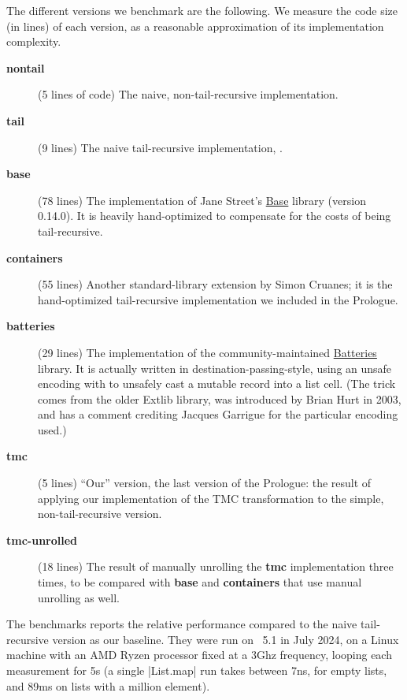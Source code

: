 \newcommand{\bench}[1]{\textbf{#1}}

The different versions we benchmark are the following. We measure the code size (in lines) of each version, as a reasonable approximation of its implementation complexity.
\begin{description}
\item[\bench{nontail}] (5 lines of code) The naive, non-tail-recursive implementation.
\item[\bench{tail}] (9 lines) The naive tail-recursive implementation,
  .
\item[\bench{base}] (78 lines) The implementation of Jane Street's
  \href{https://github.com/janestreet/base}{Base} library
  (version 0.14.0). It is heavily hand-optimized to compensate for the costs
  of being tail-recursive.
\item[\bench{containers}] (55 lines) Another standard-library extension by Simon
  Cruanes; it is the hand-optimized tail-recursive implementation we
  included in the Prologue.
\item[\bench{batteries}] (29 lines) The implementation of the community-maintained
  \href{https://github.com/ocaml-batteries-team/batteries-included/}{Batteries}
  library. It is actually written in destination-passing-style, using
  an unsafe encoding with  to unsafely cast a mutable
  record into a list cell. (The trick comes from the older Extlib
  library, was introduced by Brian Hurt in 2003, and has a comment crediting Jacques
  Garrigue for the particular encoding used.)
\item[\bench{tmc}] (5 lines) ``Our'' version, the last version of the Prologue: the
  result of applying our implementation of the TMC transformation to
  the simple, non-tail-recursive version.
\item[\bench{tmc-unrolled}] (18 lines) The result of manually unrolling the \bench{tmc} implementation three times, to be compared with \bench{base} and \bench{containers} that use manual unrolling as well.
\end{description}

The benchmarks reports the relative performance compared to the naive tail-recursive version as our baseline. They were run on \OCaml~5.1 in July 2024, on a Linux machine with an AMD Ryzen processor fixed at a 3Ghz frequency, looping each measurement for 5s (a single \ocaml|List.map| run takes between 7ns, for empty lists, and 89ms on lists with a million element).

